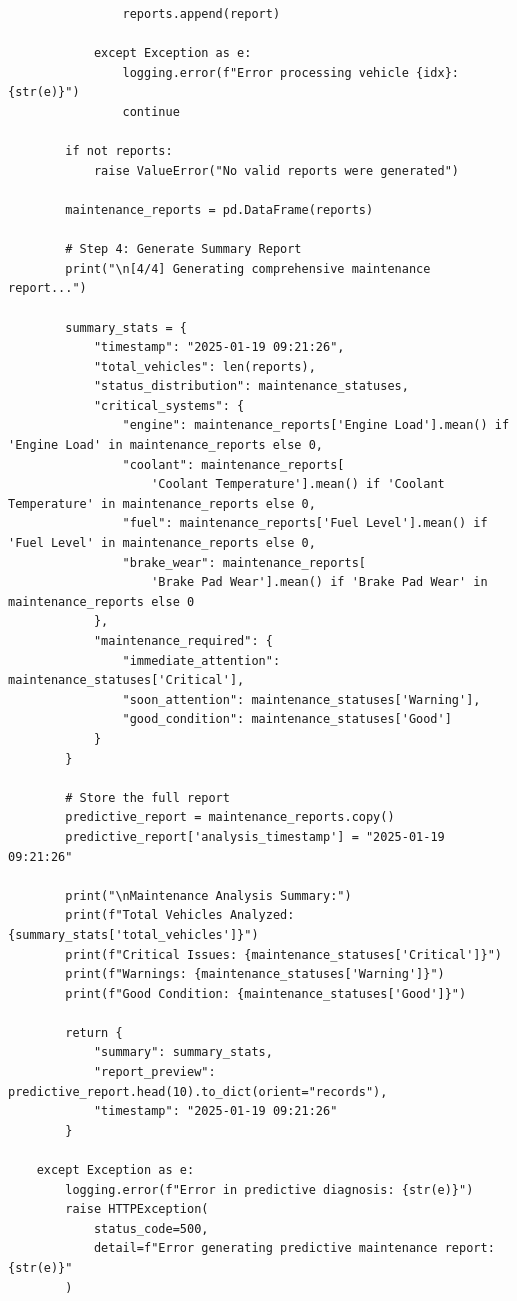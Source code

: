 \begin{enumerate}
\begin{lstlisting}
                reports.append(report)

            except Exception as e:
                logging.error(f"Error processing vehicle {idx}: {str(e)}")
                continue

        if not reports:
            raise ValueError("No valid reports were generated")

        maintenance_reports = pd.DataFrame(reports)

        # Step 4: Generate Summary Report
        print("\n[4/4] Generating comprehensive maintenance report...")

        summary_stats = {
            "timestamp": "2025-01-19 09:21:26",
            "total_vehicles": len(reports),
            "status_distribution": maintenance_statuses,
            "critical_systems": {
                "engine": maintenance_reports['Engine Load'].mean() if 'Engine Load' in maintenance_reports else 0,
                "coolant": maintenance_reports[
                    'Coolant Temperature'].mean() if 'Coolant Temperature' in maintenance_reports else 0,
                "fuel": maintenance_reports['Fuel Level'].mean() if 'Fuel Level' in maintenance_reports else 0,
                "brake_wear": maintenance_reports[
                    'Brake Pad Wear'].mean() if 'Brake Pad Wear' in maintenance_reports else 0
            },
            "maintenance_required": {
                "immediate_attention": maintenance_statuses['Critical'],
                "soon_attention": maintenance_statuses['Warning'],
                "good_condition": maintenance_statuses['Good']
            }
        }

        # Store the full report
        predictive_report = maintenance_reports.copy()
        predictive_report['analysis_timestamp'] = "2025-01-19 09:21:26"

        print("\nMaintenance Analysis Summary:")
        print(f"Total Vehicles Analyzed: {summary_stats['total_vehicles']}")
        print(f"Critical Issues: {maintenance_statuses['Critical']}")
        print(f"Warnings: {maintenance_statuses['Warning']}")
        print(f"Good Condition: {maintenance_statuses['Good']}")

        return {
            "summary": summary_stats,
            "report_preview": predictive_report.head(10).to_dict(orient="records"),
            "timestamp": "2025-01-19 09:21:26"
        }

    except Exception as e:
        logging.error(f"Error in predictive diagnosis: {str(e)}")
        raise HTTPException(
            status_code=500,
            detail=f"Error generating predictive maintenance report: {str(e)}"
        )
        \end{lstlisting}


\end{enumerate}
